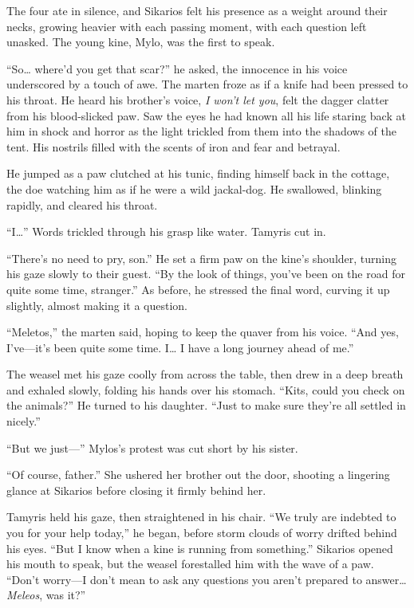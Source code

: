 The four ate in silence, and Sikarios felt his presence as a weight around their necks, growing heavier with each passing moment, with each question left unasked. The young kine, Mylo, was the first to speak.

``So\ldots{} where'd you get that scar?'' he asked, the innocence in his voice underscored by a touch of awe. The marten froze as if a knife had been pressed to his throat. He heard his brother's voice, \emph{I won't let you}, felt the dagger clatter from his blood-slicked paw. Saw the eyes he had known all his life staring back at him in shock and horror as the light trickled from them into the shadows of the tent. His nostrils filled with the scents of iron and fear and betrayal.

He jumped as a paw clutched at his tunic, finding himself back in the cottage, the doe watching him as if he were a wild jackal-dog. He swallowed, blinking rapidly, and cleared his throat.

``I\ldots'' Words trickled through his grasp like water. Tamyris cut in.

``There's no need to pry, son.'' He set a firm paw on the kine's shoulder, turning his gaze slowly to their guest. ``By the look of things, you've been on the road for quite some time, stranger.'' As before, he stressed the final word, curving it up slightly, almost making it a question.

``Meletos,'' the marten said, hoping to keep the quaver from his voice. ``And yes, I've---it's been quite some time. I\ldots{} I have a long journey ahead of me.''

The weasel met his gaze coolly from across the table, then drew in a deep breath and exhaled slowly, folding his hands over his stomach. ``Kits, could you check on the animals?'' He turned to his daughter. ``Just to make sure they're all settled in nicely.''

``But we just---'' Mylos's protest was cut short by his sister.

``Of course, father.'' She ushered her brother out the door, shooting a lingering glance at Sikarios before closing it firmly behind her.

Tamyris held his gaze, then straightened in his chair. ``We truly are indebted to you for your help today,'' he began, before storm clouds of worry drifted behind his eyes. ``But I know when a kine is running from something.'' Sikarios opened his mouth to speak, but the weasel forestalled him with the wave of a paw. ``Don't worry---I don't mean to ask any questions you aren't prepared to answer\ldots{} \emph{Meleos}, was it?''

